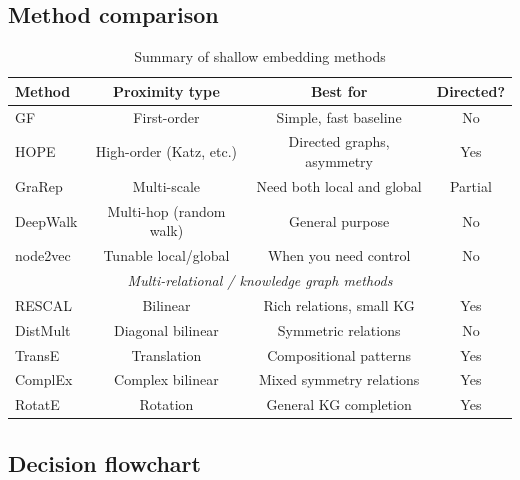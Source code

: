 \begin{notechapter}
\subsection{Method comparison}

\begin{table}[htbp]
\centering
\caption{Summary of shallow embedding methods}
\begin{tabular}{@{}lccc@{}}
\toprule
Method & Proximity type & Best for & Directed? \\
\midrule
GF & First-order & Simple, fast baseline & No \\
HOPE & High-order (Katz, etc.) & Directed graphs, asymmetry & Yes \\
GraRep & Multi-scale & Need both local and global & Partial \\
\midrule
DeepWalk & Multi-hop (random walk) & General purpose & No \\
node2vec & Tunable local/global & When you need control & No \\
\midrule
\multicolumn{4}{c}{\emph{Multi-relational / knowledge graph methods}} \\
\midrule
RESCAL & Bilinear & Rich relations, small KG & Yes \\
DistMult & Diagonal bilinear & Symmetric relations & No \\
TransE & Translation & Compositional patterns & Yes \\
ComplEx & Complex bilinear & Mixed symmetry relations & Yes \\
RotatE & Rotation & General KG completion & Yes \\
\bottomrule
\end{tabular}
\end{table}

\subsection{Decision flowchart}

\begin{figure}[htbp]
\centering
{}
\end{figure}
\end{notechapter}
